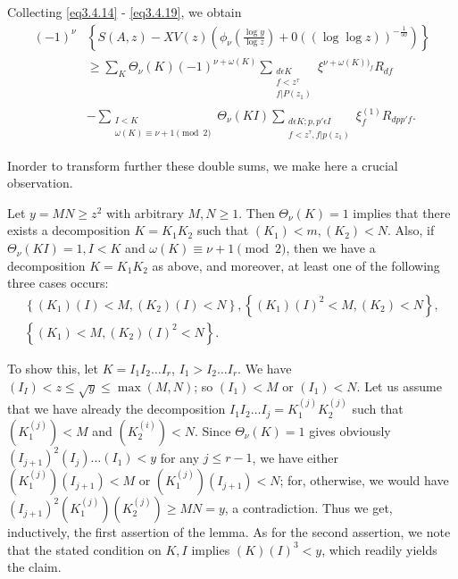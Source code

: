 Collecting \eqref{eq3.4.14} - \eqref{eq3.4.19}, we obtain
\begin{align*}
  (-1)^\nu &\left\{ S(A,z) -XV(z) \left(\phi_\nu \left(\frac{\log y}{\log
  z}\right) + 0 ((\log \log z))^{-\frac{1}{50}} \right)\right\} \\
  &\geq \sum_{K} \Theta_\nu (K) (-1)^{\nu + \omega (K)}
  \sum_{\substack{d \epsilon  K\\ f < z^\tau \\ f | P (z_1)}}
  \xi^{\nu + \omega (K))_{f}}R_{df}\\ 
  &- \sum_{\substack{I < K \\ \omega (K) \equiv \nu + 1 \pmod{2}}}
  \Theta_\nu (KI) \sum_{\substack{ d \epsilon  K; p, p' \epsilon 
      I \\ f < z^\tau, f | p (z_1)}} \xi^{(1)}_f
  R_{dpp'f}. \tag{3.4.20}\label{eq3.4.20} 
\end{align*}

In\pageoriginale order to transform further these double sums, we make here a
crucial observation. 
\begin{Lemma}\label{chap3-lem16}%
 Let $y = MN \geq z^2$ with arbitrary $M, N \geq 1$. Then
   $\Theta_\nu (K) = 1$ implies that there exists a decomposition
   $K=K_1 K_2$ such that $(K_1) < m, (K_2) < N$. Also, if $\Theta_\nu
   (KI) = 1, I < K$ and $\omega (K) \equiv \nu + 1 \pmod{2}$, then we
   have a decomposition $K = K_1K_2$ as above, and moreover, at least
   one of the following three cases occurs: 
   \begin{multline*}
      \left\{ (K_1) (I) < M, (K_2) (I) < N\right\}, \left\{ (K_1)
     (I)^2 < M, (K_2) < N \right\},\\
      \left\{ (K_1) < M, (K_2) (I)^2 < N \right\}.
   \end{multline*}
\end{Lemma}

To show this, let $K = I_1 I_2 \ldots I_r$, $I_1 > I_2 \ldots I_r$. We
have $(I_I) < z \leq \sqrt{y} \leq \max (M, N)$; so $(I_1) < M$ or
$(I_1) < N$. Let us assume that we have already the decomposition
$I_1I_2\ldots I_j = K^{(j)}_1 K^{(j)}_2$ such that $(K^{(j)}_1) < M$
and $(K^{(i)}_2) < N$. Since $\Theta_\nu (K) = 1$ gives obviously
$(I_{j + 1})^2 (I_j) \ldots (I_1) < y$ for any $j \leq r - 1$, we have
either $(K^{(j)}_1) (I_{j + 1}) < M$ or $(K^{(j)}_1) (I_{j + 1}) < N$;
for, otherwise, we would have $(I_{j + 1})^{2} (K^{(j)}_1) (K^{(j)}_2)
\geq MN = y$, a contradiction. Thus we get, inductively, the first
assertion of the lemma. As for the second assertion, we note that the
stated condition on $K, I$  implies $(K)(I)^3 < y$, which readily
yields the claim. 

